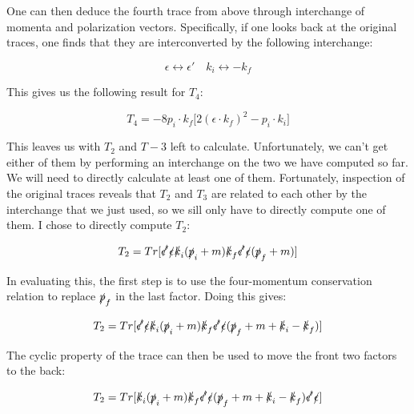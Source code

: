 \documentclass[a4]{article}
\begin{document}
    One can then deduce the fourth trace from above through interchange of momenta and polarization vectors. Specifically, if one looks back at the original traces, one finds that
    they are interconverted by the following interchange:

    \begin{equation}
        \epsilon \leftrightarrow \epsilon' \quad k_i \leftrightarrow - k_f
    \end{equation}

    This gives us the following result for $T_4$:

    \begin{framed}
        \begin{equation}
            T_4 = - 8 p_i \cdot k_f \big[ 2 (\epsilon \cdot k_f)^2 - p_i \cdot k_i \big]
        \end{equation}
    \end{framed}

    This leaves us with $T_2$ and $T-3$ left to calculate. Unfortunately, we can't get either of them by performing an interchange on the two we have computed so far. We will need
    to directly calculate at least one of them. Fortunately, inspection of the original traces reveals that $T_2$ and $T_3$ are related to each other by the interchange that we just
    used, so we sill only have to directly compute one of them. I chose to directly compute $T_2$:

    \begin{equation}
        T_2 = Tr [ \slashed{\epsilon'} \slashed{\epsilon} \slashed{k}_i (\slashed{p}_i + m) \slashed{k}_f \slashed{\epsilon'} \slashed{\epsilon} (\slashed{p}_f + m) ]
    \end{equation}

    In evaluating this, the first step is to use the four-momentum conservation relation to replace $\slashed{p}_f$ in the last factor. Doing this gives:

    \begin{equation}
        T_2 = Tr [ \slashed{\epsilon'} \slashed{\epsilon} \slashed{k}_i (\slashed{p}_i + m) \slashed{k}_f \slashed{\epsilon'} \slashed{\epsilon} (\slashed{p}_f + m + \slashed{k}_i - \slashed{k}_f) ]
    \end{equation}

    The cyclic property of the trace can then be used to move the front two factors to the back:

    \begin{equation}
        T_2 = Tr [ \slashed{k}_i (\slashed{p}_i + m) \slashed{k}_f \slashed{\epsilon'} \slashed{\epsilon} (\slashed{p}_f + m + \slashed{k}_i - \slashed{k}_f) \slashed{\epsilon'} \slashed{\epsilon} ]
    \end{equation}
\end{document}
